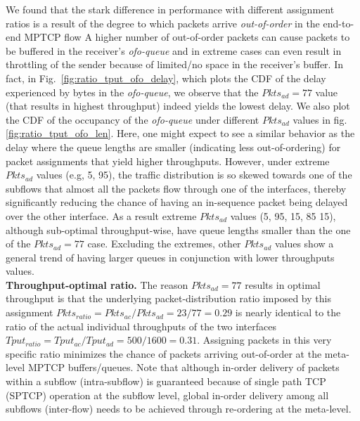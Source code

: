 We found that the stark difference in performance with different
assignment ratios is a result of the degree to which packets arrive
\textit{out-of-order} in the end-to-end MPTCP flow 
A higher number of out-of-order packets can cause
packets to be buffered in the receiver's \emph{ofo-queue} and in
extreme cases can even result in throttling of the sender because of
limited/no space in the receiver's buffer. In fact, in
Fig.~\ref{fig:ratio_tput_ofo_delay}, which plots the CDF of the delay
experienced by bytes in the \emph{ofo-queue}, we observe that
the $Pkts_{ad}=77$ value (that results in highest throughput) indeed
yields the lowest delay. 
We also plot the CDF of the
occupancy of the \emph{ofo-queue} under different $Pkts_{ad}$
values in fig. \ref{fig:ratio_tput_ofo_len}. Here, one might expect to
see a similar behavior as the delay where the queue lengths are smaller
(indicating less out-of-ordering) for packet assignments that yield
higher throughputs. However, under extreme $Pkts_{ad}$ values
(e.g, 5, 95), the traffic distribution is so skewed towards one of
the subflows that almost all the packets flow through one of
the interfaces, thereby significantly reducing the chance of having an
in-sequence packet being delayed over the other interface. As a result
extreme $Pkts_{ad}$ values (5, 95, 15, 85 15), although sub-optimal
throughput-wise, have queue lengths smaller than the one of the $Pkts_{ad}=77$ case.
Excluding the extremes, other $Pkts_{ad}$ values show a general trend of
having larger queues in conjunction with lower throughputs values.
\fi
\\
\noindent\textbf{Throughput-optimal ratio.} The reason $Pkts_{ad}=77$ results in optimal throughput is that
the underlying packet-distribution ratio imposed by this assignment
$Pkts_{ratio}=Pkts_{ac}/Pkts_{ad}=23/77=0.29$ is nearly identical to
the ratio of the actual individual throughputs of the two interfaces
$Tput_{ratio}=Tput_{ac}/Tput_{ad}=500/1600=0.31$. Assigning packets in
this very specific ratio minimizes the chance of packets arriving
out-of-order at the meta-level MPTCP buffers/queues. 
Note that
although in-order delivery of packets within a subflow (intra-subflow)
is guaranteed because of single path TCP (SPTCP) operation at the subflow level,
global in-order delivery among all subflows (inter-flow) needs
to be achieved through re-ordering at the meta-level.
\fi
